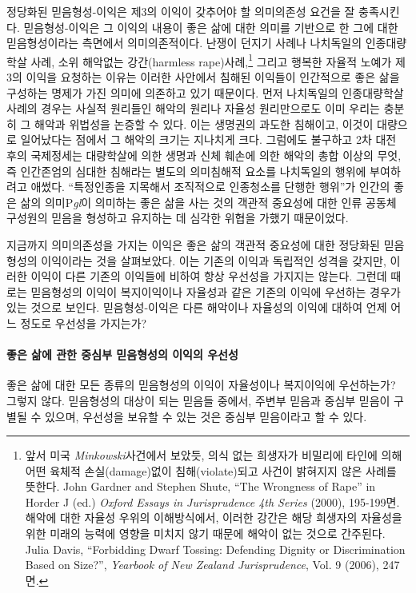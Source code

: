 정당화된 믿음형성-이익은 제3의 이익이 갖추어야 할 의미의존성 요건을 잘 충족시킨다. 믿음형성-이익은 그 이익의 내용이 좋은 삶에 대한 의미를 기반으로 한 그에 대한 믿음형성이라는 측면에서 의미의존적이다. 난쟁이 던지기 사례나 나치독일의 인종대량학살 사례, 소위 해악없는 강간(harmless rape)사례,\footnote{앞서 미국 \emph{Minkowski}사건에서 보았듯, 의식 없는 희생자가 비밀리에 타인에 의해 어떤 육체적 손실(damage)없이 침해(violate)되고 사건이 밝혀지지 않은 사례를 뜻한다. John Gardner and Stephen Shute, ``The Wrongness of Rape'' in Horder J (ed.) \emph{Oxford Essays in Jurisprudence 4th Series} (2000), 195-199면. 해악에 대한 자율성 우위의 이해방식에서, 이러한 강간은 해당 희생자의 자율성을 위한 미래의 능력에 영향을 미치지 않기 때문에 해악이 없는 것으로 간주된다. Julia Davis, ``Forbidding Dwarf Tossing: Defending Dignity or Discrimination Based on Size?'', \emph{Yearbook of New Zealand Jurisprudence}, Vol. 9 (2006), 247면.} 그리고 행복한 자율적 노예가 제3의 이익을 요청하는 이유는 이러한 사안에서 침해된 이익들이 인간적으로 좋은 삶을 구성하는 명제가 가진 의미에 의존하고 있기 때문이다. 먼저 나치독일의 인종대량학살 사례의 경우는 사실적 원리들인 해악의 원리나 자율성 원리만으로도 이미 우리는 충분히 그 해악과 위법성을 논증할 수 있다. 이는 생명권의 과도한 침해이고, 이것이 대량으로 일어났다는 점에서 그 해악의 크기는 지나치게 크다. 그럼에도 불구하고 2차 대전 후의 국제정세는 대량학살에 의한 생명과 신체 훼손에 의한 해악의 총합 이상의 무엇, 즉 인간존엄의 심대한 침해라는 별도의 의미침해적 요소를 나치독일의 행위에 부여하려고 애썼다. ``특정인종을 지목해서 조직적으로 인종청소를 단행한 행위''가 인간의 좋은 삶의 의미P\emph{gl}이 의미하는 좋은 삶을 사는 것의 객관적 중요성에 대한 인류 공동체 구성원의 믿음을 형성하고 유지하는 데 심각한 위협을 가했기 때문이었다.

지금까지 의미의존성을 가지는 이익은 좋은 삶의 객관적 중요성에 대한 정당화된 믿음형성의 이익이라는 것을 살펴보았다. 이는 기존의 이익과 독립적인 성격을 갖지만, 이러한 이익이 다른 기존의 이익들에 비하여 항상 우선성을 가지지는 않는다. 그런데 때로는 믿음형성의 이익이 복지이익이나 자율성과 같은 기존의 이익에 우선하는 경우가 있는 것으로 보인다. 믿음형성-이익은 다른 해악이나 자율성의 이익에 대하여 언제 어느 정도로 우선성을 가지는가?

\paragraph{좋은 삶에 관한 중심부 믿음형성의 이익의 우선성}

좋은 삶에 대한 모든 종류의 믿음형성의 이익이 자율성이나 복지이익에 우선하는가? 그렇지 않다. 믿음형성의 대상이 되는 믿음들 중에서, 주변부 믿음과 중심부 믿음이 구별될 수 있으며, 우선성을 보유할 수 있는 것은 중심부 믿음이라고 할 수 있다.

